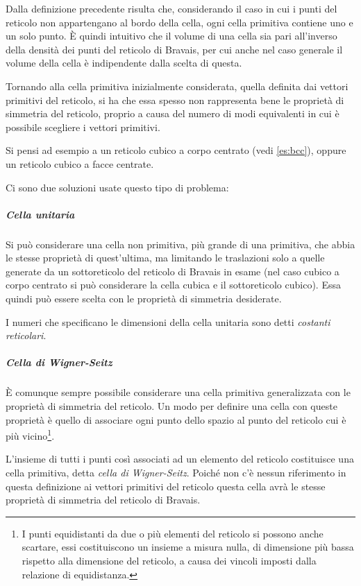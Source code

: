 Dalla definizione precedente risulta che, considerando il caso in cui i punti del reticolo non appartengano al bordo della cella, ogni cella primitiva contiene uno e un solo punto. \`E quindi intuitivo che il volume di una cella sia pari all'inverso della densità dei punti del reticolo di Bravais, per cui anche nel caso generale il volume della cella è indipendente dalla scelta di questa.
\newline

Tornando alla cella primitiva inizialmente considerata, quella definita dai vettori primitivi del reticolo, si ha che essa spesso non rappresenta bene le proprietà di simmetria del reticolo, proprio a causa del numero di modi equivalenti in cui è possibile scegliere i vettori primitivi.
 
Si pensi ad esempio a un reticolo cubico a corpo centrato (vedi \cref{es:bcc}), oppure un reticolo cubico a facce centrate.

Ci sono due soluzioni usate questo tipo di problema:

\subparagraph{Cella unitaria} Si può considerare una cella non primitiva, più grande di una primitiva, che abbia le stesse proprietà di quest'ultima, ma limitando le traslazioni solo a quelle generate da un sottoreticolo del reticolo di Bravais in esame (nel caso cubico a corpo centrato si può considerare la cella cubica e il sottoreticolo cubico).
Essa quindi può essere scelta con le proprietà di simmetria desiderate.

I numeri che specificano le dimensioni della cella unitaria sono detti \textit{costanti reticolari}.

\subparagraph{Cella di Wigner-Seitz} \`E comunque sempre possibile considerare una cella primitiva generalizzata con le proprietà di simmetria del reticolo. Un modo per definire una cella con queste proprietà è quello di associare ogni punto dello spazio al punto del reticolo cui è più vicino\footnote{\label{note:wigseitz} I punti equidistanti da due o più elementi del reticolo si possono anche scartare, essi costituiscono un insieme a misura nulla, di dimensione più bassa rispetto alla dimensione del reticolo, a causa dei vincoli imposti dalla relazione di equidistanza.}.

L'insieme di tutti i punti così associati ad un elemento del reticolo costituisce una cella primitiva, detta \textit{cella di Wigner-Seitz}.
Poiché non c'è nessun riferimento in questa definizione ai vettori primitivi del reticolo questa cella avrà le stesse proprietà di simmetria del reticolo di Bravais.

